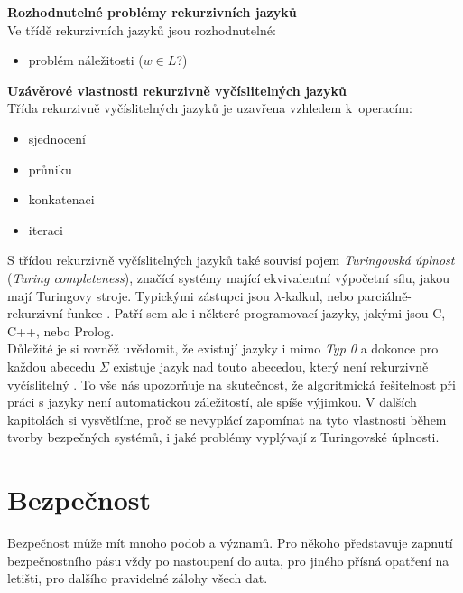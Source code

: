 \textbf{Rozhodnutelné problémy rekurzivních jazyků} \\
Ve třídě rekurzivních jazyků jsou rozhodnutelné:
\begin{itemize}
\item problém náležitosti ($w \in L$?) \cite[str. 133]{TIN2013}
\end{itemize}
\vspace*{\baselineskip}

\textbf{Uzávěrové vlastnosti rekurzivně vyčíslitelných jazyků} \\
Třída rekurzivně vyčíslitelných jazyků je uzavřena vzhledem k~operacím:
\begin{itemize}
\item sjednocení
\item průniku
\item konkatenaci
\item iteraci \cite[str. 119]{TIN2013}
\end{itemize}
\vspace*{\baselineskip}

\newpage
S třídou rekurzivně vyčíslitelných jazyků také souvisí pojem \textit{Turingovská úplnost} (\textit{Turing completeness}), značící
systémy mající ekvivalentní výpočetní sílu, jakou mají Turingovy stroje. Typickými zástupci jsou $\lambda$-kalkul, nebo parciálně-rekurzivní funkce
\cite[str. 135]{TIN2013}. Patří sem ale i některé programovací jazyky, jakými jsou C, C++, nebo Prolog. \\

Důležité je si rovněž uvědomit, že existují jazyky i mimo \textit{Typ 0} a dokonce pro každou abecedu $\Sigma$ existuje jazyk nad touto abecedou,
který není rekurzivně vyčíslitelný \cite[str.~124]{TIN2013}. To vše nás upozorňuje na skutečnost, že algoritmická řešitelnost při práci s jazyky
není automatickou záležitostí, ale spíše výjimkou. V dalších kapitolách si vysvětlíme, proč se nevyplácí zapomínat na tyto vlastnosti během 
tvorby bezpečných systémů, i jaké problémy vyplývají z Turingovské úplnosti. 


\chapter{Bezpečnost} \label{ch:security}
Bezpečnost může mít mnoho podob a významů. Pro někoho představuje zapnutí bezpečnostního pásu vždy po nastoupení do auta, pro jiného přísná opatření 
na letišti, pro dalšího pravidelné zálohy všech dat. \\

